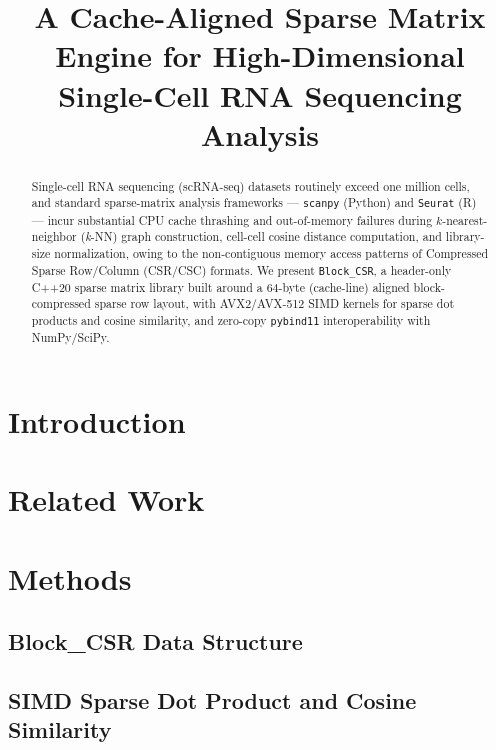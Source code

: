 \documentclass[11pt]{article}
\title{A Cache-Aligned Sparse Matrix Engine for High-Dimensional \\
       Single-Cell RNA Sequencing Analysis}
\author{%
}
\date{}
\begin{document}
\maketitle

\begin{abstract}
Single-cell RNA sequencing (scRNA-seq) datasets routinely exceed one million
cells, and standard sparse-matrix analysis frameworks --- \texttt{scanpy}
(Python) and \texttt{Seurat} (R) --- incur substantial CPU cache thrashing
and out-of-memory failures during $k$-nearest-neighbor (\emph{k}-NN) graph
construction, cell-cell cosine distance computation, and library-size
normalization, owing to the non-contiguous memory access patterns of
Compressed Sparse Row/Column (CSR/CSC) formats. We present
\texttt{Block\_CSR}, a header-only C++20 sparse matrix library built around a
64-byte (cache-line) aligned block-compressed sparse row layout, with
AVX2/AVX-512 SIMD kernels for sparse dot products and cosine similarity, and
zero-copy \texttt{pybind11} interoperability with NumPy/SciPy. %
\end{abstract}

\section{Introduction}

\section{Related Work}

\section{Methods}

\subsection{Block\_CSR Data Structure}

\subsection{SIMD Sparse Dot Product and Cosine Similarity}
\end{document}
